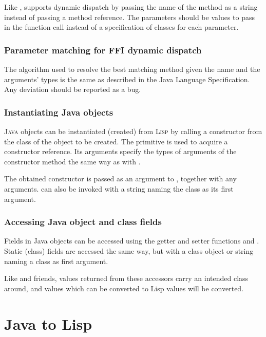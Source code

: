 \documentclass[10pt]{book}
\begin{document}
Like ,  supports dynamic dispatch by
passing the name of the method as a string instead of passing a method reference.
The parameters should be values to pass in the function call instead of
a specification of classes for each parameter.

\subsubsection{Parameter matching for FFI dynamic dispatch}
\label{sec:param-matching-for-ffi}

The algorithm used to resolve the best matching method given the name
and the arguments' types is the same as described in the Java Language
Specification. Any deviation should be reported as a bug.


\subsubsection{Instantiating Java objects}

\textsc{Java} objects can be instantiated (created) from \textsc{Lisp} by calling
a constructor from the class of the object to be created. The
 primitive is used to acquire a constructor
reference. Its arguments specify the types of arguments of the constructor
method the same way as with .

The obtained constructor is passed as an argument to ,
together with any arguments.   can also be invoked with
a string naming the class as its first argument.

\subsubsection{Accessing Java object and class fields}

Fields in Java objects can be accessed using the getter and setter
functions  and .  Static
(class) fields are accessed the same way, but with a class object or
string naming a class as first argument.

Like  and friends, values returned from these accessors carry
an intended class around, and values which can be converted to Lisp values will
be converted.

\section{Java to Lisp}
\end{document}
